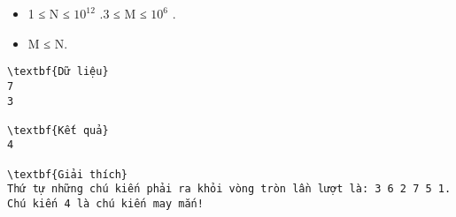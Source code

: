 \begin{itemize}
	\item     1 ≤ N ≤ $10^{12}$    .3 ≤ M ≤ $10^{6}$    .   
	\item     M ≤ N.   
\end{itemize}
\begin{verbatim}
\textbf{Dữ liệu}
7 
3

\textbf{Kết quả}
4

\textbf{Giải thích}
Thứ tự những chú kiến phải ra khỏi vòng tròn lần lượt là: 3 6 2 7 5 1.
Chú kiến 4 là chú kiến may mắn!
\end{verbatim}